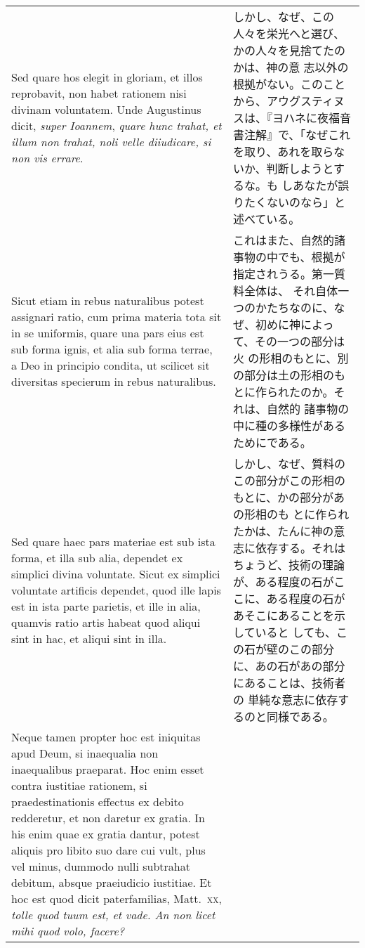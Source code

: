\documentclass[10pt]{jsarticle} %
\begin{document}
\begin{longtable}{p{21em}p{21em}}
\\



Sed
quare hos elegit in gloriam, et illos reprobavit, non habet rationem
nisi divinam voluntatem. Unde Augustinus dicit, {\itshape super Ioannem}, {\itshape quare
hunc trahat, et illum non trahat, noli velle diiudicare, si non vis
errare}. 


&

しかし、なぜ、この人々を栄光へと選び、かの人々を見捨てたのかは、神の意
志以外の根拠がない。このことから、アウグスティヌスは、『ヨハネに夜福音
書注解』で、「なぜこれを取り、あれを取らないか、判断しようとするな。も
しあなたが誤りたくないのなら」と述べている。

\\


Sicut etiam in rebus naturalibus potest assignari ratio, cum
prima materia tota sit in se uniformis, quare una pars eius est sub
forma ignis, et alia sub forma terrae, a Deo in principio condita, ut
scilicet sit diversitas specierum in rebus naturalibus. 

&



これはまた、自然的諸事物の中でも、根拠が指定されうる。第一質料全体は、
それ自体一つのかたちなのに、なぜ、初めに神によって、その一つの部分は火
の形相のもとに、別の部分は土の形相のもとに作られたのか。それは、自然的
諸事物の中に種の多様性があるためにである。


\\



Sed quare haec
pars materiae est sub ista forma, et illa sub alia, dependet ex simplici
divina voluntate. Sicut ex simplici voluntate artificis dependet, quod
ille lapis est in ista parte parietis, et ille in alia, quamvis ratio
artis habeat quod aliqui sint in hac, et aliqui sint in illa. 


&

しかし、なぜ、質料のこの部分がこの形相のもとに、かの部分があの形相のも
とに作られたかは、たんに神の意志に依存する。それはちょうど、技術の理論
が、ある程度の石がここに、ある程度の石があそこにあることを示していると
しても、この石が壁のこの部分に、あの石があの部分にあることは、技術者の
単純な意志に依存するのと同様である。


\\


Neque
tamen propter hoc est iniquitas apud Deum, si inaequalia non
inaequalibus praeparat. Hoc enim esset contra iustitiae rationem, si
praedestinationis effectus ex debito redderetur, et non daretur ex
gratia. In his enim quae ex gratia dantur, potest aliquis pro libito suo
dare cui vult, plus vel minus, dummodo nulli subtrahat debitum, absque
praeiudicio iustitiae. Et hoc est quod dicit paterfamilias, Matt.~{\scshape xx},
{\itshape tolle quod tuum est, et vade. An non licet mihi quod volo, facere?}


\end{longtable}
\end{document}
